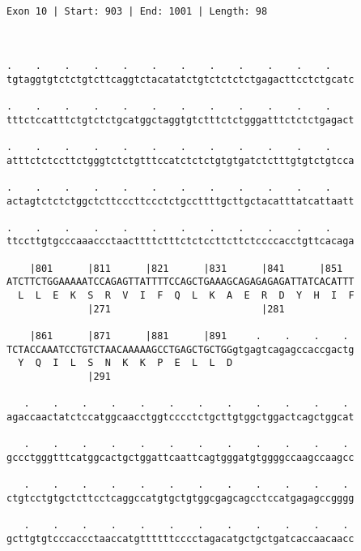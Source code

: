 \documentclass{article}
\begin{document}
\begin{Verbatim}
    
 
Exon 10 | Start: 903 | End: 1001 | Length: 98



.    .    .    .    .    .    .    .    .    .    .    .    
tgtaggtgtctctgtcttcaggtctacatatctgtctctctctgagacttcctctgcatc
                                                            
.    .    .    .    .    .    .    .    .    .    .    .    
tttctccatttctgtctctgcatggctaggtgtctttctctgggatttctctctgagact
                                                            
.    .    .    .    .    .    .    .    .    .    .    .    
atttctctccttctgggtctctgtttccatctctctgtgtgatctctttgtgtctgtcca
                                                            
.    .    .    .    .    .    .    .    .    .    .    .    
actagtctctctggctcttcccttccctctgccttttgcttgctacatttatcattaatt
                                                            
.    .    .    .    .    .    .    .    .    .    .    .    
ttccttgtgcccaaaccctaacttttctttctctccttcttctccccacctgttcacaga
                                                            
    |801      |811      |821      |831      |841      |851  
ATCTTCTGGAAAAATCCAGAGTTATTTTCCAGCTGAAAGCAGAGAGAGATTATCACATTT
  L  L  E  K  S  R  V  I  F  Q  L  K  A  E  R  D  Y  H  I  F
              |271                          |281            
  
    |861      |871      |881      |891     .    .    .    . 
TCTACCAAATCCTGTCTAACAAAAAGCCTGAGCTGCTGGgtgagtcagagccaccgactg
  Y  Q  I  L  S  N  K  K  P  E  L  L  D                     
              |291                                          
  
   .    .    .    .    .    .    .    .    .    .    .    . 
agaccaactatctccatggcaacctggtcccctctgcttgtggctggactcagctggcat
                                                            
   .    .    .    .    .    .    .    .    .    .    .    . 
gccctgggtttcatggcactgctggattcaattcagtgggatgtggggccaagccaagcc
                                                            
   .    .    .    .    .    .    .    .    .    .    .    . 
ctgtcctgtgctcttcctcaggccatgtgctgtggcgagcagcctccatgagagccgggg
                                                            
   .    .    .    .    .    .    .    .    .    .    .    . 
gcttgtgtcccaccctaaccatgttttttcccctagacatgctgctgatcaccaacaacc
                                                            

\end{Verbatim}
\end{document}
